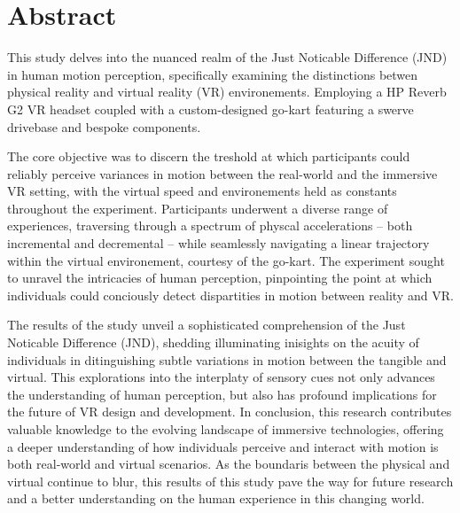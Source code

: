 \documentclass[a4paper, 12pt, oneside]{article}
\begin{document}
    \setlength{\parskip}{2ex}
    \tableofcontents
    \clearpage

    \section{Abstract}
    
        This study delves into the nuanced realm of the Just Noticable Difference (JND) in 
        human motion perception, specifically examining the distinctions betwen physical reality 
        and virtual reality (VR) environements. Employing a HP Reverb G2 VR headset coupled with a 
        custom-designed go-kart featuring a swerve drivebase and bespoke components. 
        \newline

        The core 
        objective was to discern the treshold at which participants could reliably perceive variances
        in motion between the real-world and the immersive VR setting, with the virtual speed and environements
        held as constants throughout the experiment. Participants underwent a diverse range of experiences, traversing through a spectrum of physcal 
        accelerations -- both incremental and decremental -- while seamlessly navigating a linear trajectory 
        within the virtual environement, courtesy of the go-kart. The experiment sought to unravel the intricacies
        of human perception, pinpointing the point at which individuals could conciously detect dispartities in motion
        between reality and VR. 
        \newline

        The results of the study unveil a sophisticated comprehension of the Just Noticable Difference (JND), shedding 
        illuminating inisights on the acuity of individuals in ditinguishing subtle variations in motion between the 
        tangible and virtual. This explorations into the interplaty of sensory cues not only advances the understanding of 
        human perception, but also has profound implications for the future of VR design and development. 
        In conclusion, this research contributes valuable knowledge to the evolving landscape of immersive technologies, 
        offering a deeper understanding of how individuals perceive and interact with motion is both real-world 
        and virtual scenarios. As the boundaris between the physical and virtual continue to blur, this results of 
        this study pave the way for future research and a better understanding on the human experience in this changing world. 
        \clearpage
\end{document}
